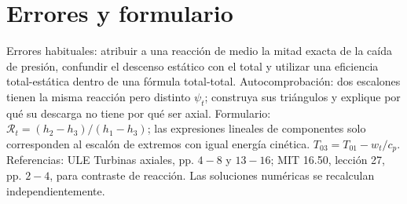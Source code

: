 \documentclass[10pt,openany]{book}
\begin{document}
\section{Errores y formulario}

Errores habituales: atribuir a una reacción de medio la mitad exacta de la caída de presión, confundir el descenso estático con el total y utilizar una eficiencia total-estática dentro de una fórmula total-total. Autocomprobación: dos escalones tienen la misma reacción pero distinto \(\psi_t\); construya sus triángulos y explique por qué su descarga no tiene por qué ser axial.
Formulario: \(\mathcal R_t=(h_2-h_3)/(h_1-h_3)\); las expresiones lineales de componentes solo corresponden al escalón de extremos con igual energía cinética. \(T_{03}=T_{01}-w_t/c_p\). Referencias: ULE Turbinas axiales, pp. \(4-8\) y \(13-16\); MIT 16.50, lección 27, pp. \(2-4\), para contraste de reacción. Las soluciones numéricas se recalculan independientemente.
\end{document}
